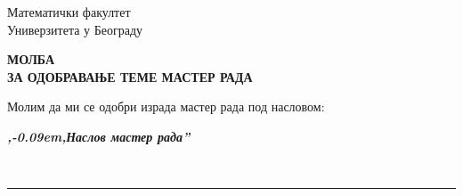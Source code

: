 \documentclass[a4paper]{article}
\def\zn{,\kern-0.09em,}
\begin{document}
\thispagestyle{empty}

\begin{flushleft}
Математички факултет\\
Универзитета у Београду
\end{flushleft}

\bigskip

\begin{center}
\textbf{МОЛБА\\
ЗА ОДОБРАВАЊЕ ТЕМЕ МАСТЕР РАДА
}\end{center}

\bigskip

\begin{flushleft}
Молим да ми се одобри израда мастер рада под насловом:
\end{flushleft}

\begin{minipage}{16.5cm}
\textbf{\textit{\zn Наслов мастер рада''}}
\end{minipage}\\
\rule[4mm]{17.5cm}{.05mm}
\end{document}
